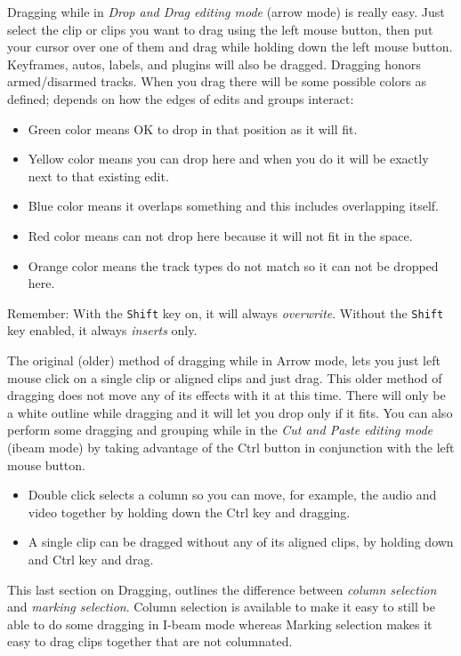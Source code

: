 Dragging while in \textit{Drop and Drag editing mode} (arrow mode)
is really easy.  Just select the clip or clips you want to drag
using the left mouse button, then put your cursor over one of them
and drag while holding down the left mouse button.  Keyframes,
autos, labels, and plugins will also be dragged.  Dragging honors
armed/disarmed tracks.  When you drag there will be some possible
colors as defined; depends on how the edges of edits and groups
interact:

\begin{itemize}
\item Green color means OK to drop in that position as it will
  fit.
\item Yellow color means you can drop here and when you do it
  will be exactly next to that existing edit.
\item Blue color means it overlaps something and this includes
  overlapping itself.
\item Red color means can not drop here because it will not fit
  in the space.
\item Orange color means the track types do not match so it can
  not be dropped here.
\end{itemize}

Remember: With the \texttt{Shift} key on, it will always
\textit{overwrite}. Without the \texttt{Shift} key enabled, it
always \textit{inserts} only.

The original (older) method of dragging while in Arrow mode, lets
you just left mouse click on a single clip or aligned clips and just
drag.  This older method of dragging does not move any of its
effects with it at this time.  There will only be a white outline
while dragging and it will let you drop only if it fits.  You can
also perform some dragging and grouping while in the \textit{Cut and
  Paste editing mode} (ibeam mode) by taking advantage of the Ctrl
button in conjunction with the left mouse button.

\begin{itemize}
\item Double click selects a column so you can move, for
  example, the audio and video together by holding down the Ctrl key
  and dragging.
\item A single clip can be dragged without any of its aligned
  clips, by holding down and Ctrl key and drag.
\end{itemize}

This last section on Dragging, outlines the difference
between \textit{column selection} and \textit{marking selection}.
Column selection is available to make it easy to still be able to do
some dragging in I-beam mode whereas Marking selection makes it easy
to drag clips together that are not columnated.


